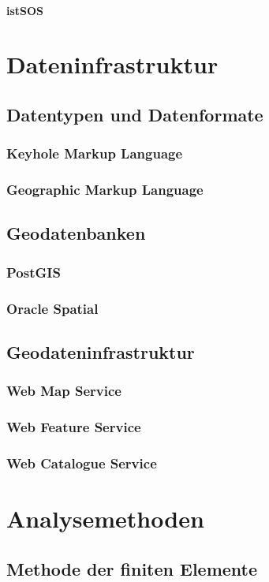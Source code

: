 \paragraph{istSOS}

\section{Dateninfrastruktur}
\subsection{Datentypen und Datenformate}
\subsubsection{Keyhole Markup Language}
\subsubsection{Geographic Markup Language}
\subsection{Geodatenbanken}
\subsubsection{PostGIS}
\subsubsection{Oracle Spatial}
\subsection{Geodateninfrastruktur}
\subsubsection{Web Map Service}
\subsubsection{Web Feature Service}
\subsubsection{Web Catalogue Service}

\section{Analysemethoden}
\subsection{Methode der finiten Elemente}
